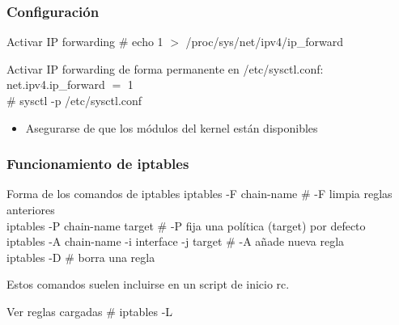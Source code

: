 \documentclass{beamer}
\begin{document}

\begin{frame}
\frametitle{Configuración}


\begin{block}{Activar IP forwarding}
\# echo 1 $>$ /proc/sys/net/ipv4/ip\_forward
\end{block}

\begin{block}{Activar IP forwarding de forma permanente}
en /etc/sysctl.conf: \\
net.ipv4.ip\_forward $=$ 1 \\
\# sysctl -p /etc/sysctl.conf
\end{block}

\begin{itemize}
\item Asegurarse de que los módulos del kernel están disponibles
\end{itemize}

\end{frame}



\begin{frame}
\frametitle{Funcionamiento de iptables}

\begin{block}{Forma de los comandos de iptables}
\alert{iptables -F chain-name} \# -F limpia reglas anteriores \\
\alert{iptables -P chain-name target} \# -P fija una política (target) por defecto \\
\alert{iptables -A chain-name -i interface -j target} \# -A añade nueva regla \\
\alert{iptables -D}  \# borra una regla \\
\end{block}

Estos comandos suelen incluirse en un script de inicio rc.

\begin{block}{Ver reglas cargadas}
\# iptables -L
\end{block}

\end{frame}


\end{document}
